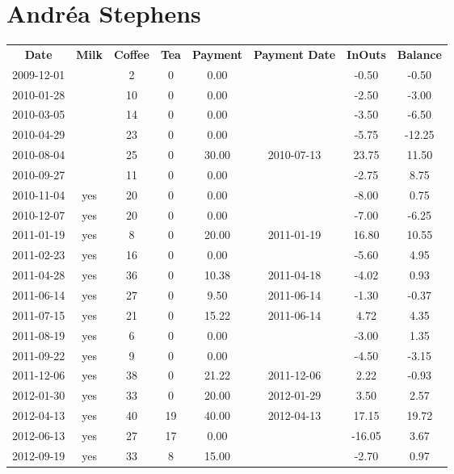 \section{Andr\'ea Stephens}

\begin{center}
\begin{tabular}{cccccccc}
\textbf{Date} & \textbf{Milk} & \textbf{Coffee} & \textbf{Tea} & \textbf{Payment} & \textbf{Payment Date} & \textbf{InOuts} & \textbf{Balance} \\
2009-12-01 &  &  2 &  0 &  0.00 &  &  -0.50 &  -0.50\\ 
2010-01-28 &  & 10 &  0 &  0.00 &  &  -2.50 &  -3.00\\ 
2010-03-05 &  & 14 &  0 &  0.00 &  &  -3.50 &  -6.50\\ 
2010-04-29 &  & 23 &  0 &  0.00 &  &  -5.75 & -12.25\\ 
2010-08-04 &  & 25 &  0 & 30.00 & 2010-07-13 &  23.75 &  11.50\\ 
2010-09-27 &  & 11 &  0 &  0.00 &  &  -2.75 &   8.75\\ 
2010-11-04 & yes & 20 &  0 &  0.00 &  &  -8.00 &   0.75\\ 
2010-12-07 & yes & 20 &  0 &  0.00 &  &  -7.00 &  -6.25\\ 
2011-01-19 & yes &  8 &  0 & 20.00 & 2011-01-19 &  16.80 &  10.55\\ 
2011-02-23 & yes & 16 &  0 &  0.00 &  &  -5.60 &   4.95\\ 
2011-04-28 & yes & 36 &  0 & 10.38 & 2011-04-18 &  -4.02 &   0.93\\ 
2011-06-14 & yes & 27 &  0 &  9.50 & 2011-06-14 &  -1.30 &  -0.37\\ 
2011-07-15 & yes & 21 &  0 & 15.22 & 2011-06-14 &   4.72 &   4.35\\ 
2011-08-19 & yes &  6 &  0 &  0.00 &  &  -3.00 &   1.35\\ 
2011-09-22 & yes &  9 &  0 &  0.00 &  &  -4.50 &  -3.15\\ 
2011-12-06 & yes & 38 &  0 & 21.22 & 2011-12-06 &   2.22 &  -0.93\\ 
2012-01-30 & yes & 33 &  0 & 20.00 & 2012-01-29 &   3.50 &   2.57\\ 
2012-04-13 & yes & 40 & 19 & 40.00 & 2012-04-13 &  17.15 &  19.72\\ 
2012-06-13 & yes & 27 & 17 &  0.00 &  & -16.05 &   3.67\\ 
2012-09-19 & yes & 33 &  8 & 15.00 &  &  -2.70 &   0.97
\end{tabular}
\end{center}

